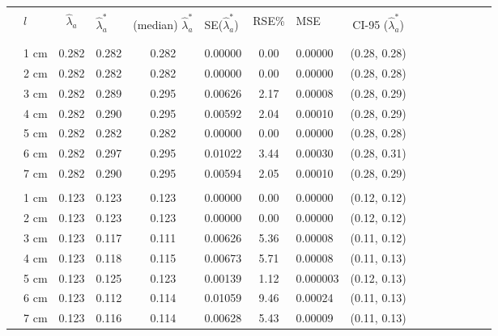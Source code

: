 \documentclass[a4paper 12pt]{article}
\numberwithin{equation}{section}
\begin{document}
\clearpage
 \begin{small}
\begin{table}[h!]
\centering
\setlength\tabcolsep{10.5pt} 
\begin{footnotesize}
\begin{tabular}{clclclclclclclcl}
  \hline \\ [0.3ex]
&  $l$ & $\hat{\lambda}_{a}$  & $\hat{\lambda}_{a}^{*}$ & (median) $\hat{\lambda}_{a}^{*}$  & SE($\hat{\lambda}_{a}^{*}$) & RSE\%& MSE &  CI-95 ($\hat{\lambda}_{a}^{*}$) \\ [1.0ex]
\hline \\
 \raisebox{1ex}{\bf age 0}  \\ [1.0ex]
&   1 cm & 0.282  &    0.282 &  0.282 &  0.00000 & 0.00 & 0.00000 & (0.28, 0.28)\\
&   2 cm & 0.282  &    0.282 &  0.282 &  0.00000 & 0.00 & 0.00000 & (0.28, 0.28)\\
&   3 cm & 0.282  &    0.289 &  0.295 &  0.00626 & 2.17 & 0.00008 & (0.28, 0.29)\\
&   4 cm & 0.282  &    0.290 &  0.295 &  0.00592 & 2.04 & 0.00010 & (0.28, 0.29)\\
&   5 cm & 0.282  &    0.282 &  0.282 &  0.00000 & 0.00 & 0.00000 & (0.28, 0.28)\\
&   6 cm & 0.282  &    0.297 &  0.295 &  0.01022 & 3.44 & 0.00030 & (0.28, 0.31)\\
&   7 cm & 0.282  &    0.290 &  0.295 &  0.00594 & 2.05 & 0.00010 & (0.28, 0.29)\\[1.2ex]

 \raisebox{1ex}{\bf age 1}&  \\ [1.0ex]
&   1 cm & 0.123 &      0.123  & 0.123 & 0.00000  & 0.00 & 0.00000 & (0.12, 0.12)\\
&   2 cm & 0.123 &      0.123  & 0.123 & 0.00000  & 0.00 & 0.00000 & (0.12, 0.12)\\
&   3 cm & 0.123 &      0.117  & 0.111 & 0.00626  & 5.36 & 0.00008 & (0.11, 0.12)\\
&   4 cm & 0.123 &      0.118  & 0.115 & 0.00673  & 5.71 & 0.00008 & (0.11, 0.13) \\
&   5 cm & 0.123 &      0.125  & 0.123 & 0.00139  & 1.12 & 0.000003 & (0.12, 0.13) \\
&   6 cm & 0.123 &      0.112  & 0.114 & 0.01059  & 9.46 & 0.00024 & (0.11, 0.13)\\
&   7 cm & 0.123 &      0.116  & 0.114 & 0.00628  & 5.43 & 0.00009 & (0.11, 0.13)\\[1.2ex]


\end{tabular}
\end{footnotesize}
\end{table}
\end{small}
\end{document}
